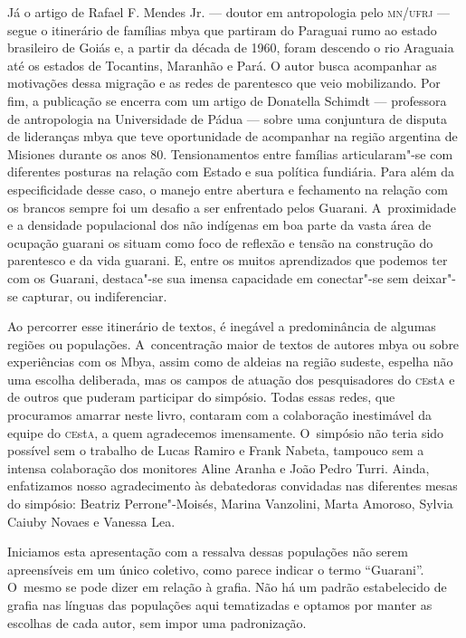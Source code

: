 Já o artigo de Rafael F. Mendes Jr. --- doutor em antropologia pelo
\textsc{mn}/\textsc{ufrj} --- segue o itinerário de famílias mbya que partiram do Paraguai
rumo ao estado brasileiro de Goiás e, a partir da década de 1960, foram
descendo o rio Araguaia até os estados de Tocantins, Maranhão e Pará. O
autor busca acompanhar as motivações dessa migração e as redes de
parentesco que veio mobilizando. Por fim, a publicação se encerra com
um artigo de Donatella Schimdt --- professora de antropologia na
Universidade de Pádua --- sobre uma conjuntura de disputa de lideranças
mbya que teve oportunidade de acompanhar na região argentina de
Misiones durante os anos 80. Tensionamentos entre famílias
articularam"-se com diferentes posturas na relação com Estado e sua
política fundiária. Para além da especificidade desse caso, o manejo
entre abertura e fechamento na relação com os brancos sempre foi um
desafio a ser enfrentado pelos Guarani. A~proximidade e a densidade
populacional dos não indígenas em boa parte da vasta área de ocupação
guarani os situam como foco de reflexão e tensão na construção do
parentesco e da vida guarani. E, entre os muitos aprendizados que
podemos ter com os Guarani, destaca"-se sua imensa capacidade em
conectar"-se sem deixar"-se capturar, ou indiferenciar.

Ao percorrer esse itinerário de textos, é inegável a predominância de
algumas regiões ou populações. A~concentração maior de textos de
autores mbya ou sobre experiências com os Mbya, assim como de aldeias
na região sudeste, espelha não uma escolha deliberada, mas os campos de
atuação dos pesquisadores do \textsc{ce}st\textsc{a} e de outros que puderam participar
do simpósio. Todas essas redes, que procuramos amarrar neste livro,
contaram com a colaboração inestimável da equipe do \textsc{ce}st\textsc{a}, a quem
agradecemos imensamente. O~simpósio não teria sido possível sem o
trabalho de Lucas Ramiro e Frank Nabeta, tampouco sem a intensa
colaboração dos monitores Aline Aranha e João Pedro Turri. Ainda, enfatizamos nosso
agradecimento às debatedoras convidadas nas diferentes mesas do
simpósio: Beatriz Perrone"-Moisés, Marina Vanzolini, Marta Amoroso,
Sylvia Caiuby Novaes e Vanessa Lea.

Iniciamos esta apresentação com a ressalva dessas populações não serem
apreensíveis em um único coletivo, como parece indicar o termo ``Guarani''.
O~mesmo se pode dizer em relação à grafia. Não há um padrão
estabelecido de grafia nas línguas das populações aqui tematizadas e
optamos por manter as escolhas de cada autor, sem impor uma
padronização. 

